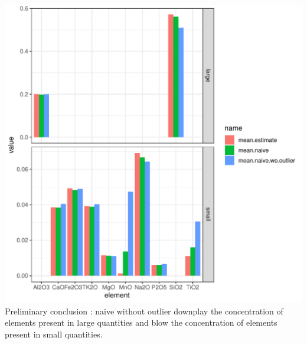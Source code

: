 \documentclass[a4paper,oneside,12pt,titlepage]{article}\usepackage[]{graphicx}\usepackage[]{color}
\makeatletter
\def\maxwidth{ %
  \ifdim\Gin@nat@width>\linewidth
    \linewidth
  \else
    \Gin@nat@width
  \fi
}
\newenvironment{kframe}{%
 \def\at@end@of@kframe{}%
 \ifinner\ifhmode%
  \def\at@end@of@kframe{\end{minipage}}%
  \begin{minipage}{\columnwidth}%
 \fi\fi%
 \def\FrameCommand##1{\hskip\@totalleftmargin \hskip-\fboxsep
 \colorbox{shadecolor}{##1}\hskip-\fboxsep
     \hskip-\linewidth \hskip-\@totalleftmargin \hskip\columnwidth}%
 \MakeFramed {\advance\hsize-\width
   \@totalleftmargin\z@ \linewidth\hsize
   \@setminipage}}%
 {\par\unskip\endMakeFramed%
 \at@end@of@kframe}
\newenvironment{knitrout}{}{} %
\makeatother
\begin{document}
\begin{knitrout}
\begin{kframe}
\begin{alltt}
\end{alltt}
\end{kframe}
\includegraphics[width=\maxwidth]{figure/unnamed-chunk-17-1} 
\end{knitrout}
Preliminary conclusion : naive without outlier downplay the concentration of elements present in large quantities and blow the concentration of elements present in small quantities.
\end{document}
